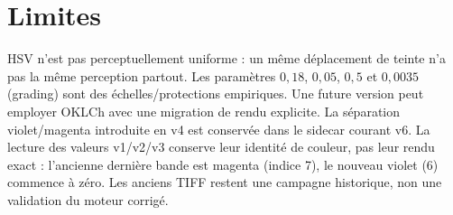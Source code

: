 \section{Limites}
HSV n'est pas perceptuellement uniforme : un même déplacement de teinte n'a pas la même perception partout. Les paramètres $0{,}18$, $0{,}05$, $0{,}5$ et $0{,}0035$ (grading) sont des échelles/protections empiriques. Une future version peut employer OKLCh avec une migration de rendu explicite. La séparation violet/magenta introduite en v4 est conservée dans le sidecar courant v6. La lecture des valeurs v1/v2/v3 conserve leur identité de couleur, pas leur rendu exact : l'ancienne dernière bande est magenta (indice 7), le nouveau violet (6) commence à zéro. Les anciens TIFF restent une campagne historique, non une validation du moteur corrigé.



